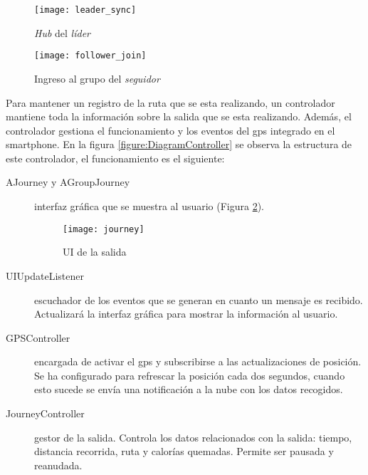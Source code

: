 \begin{figure}[H]
	\begin{minipage}{.5\textwidth}
		\begin{center}
			\texttt{[image: leader\_sync]}
			\caption{\emph{Hub} del \emph{líder}}
			\label{figure:Hub}
		\end{center}
	\end{minipage}
\begin{minipage}{.5\textwidth}
	\begin{center}
		\texttt{[image: follower\_join]}
		\caption{Ingreso al grupo del \emph{seguidor}}
		\label{figure:FollowerJoin}
	\end{center}
\end{minipage}
\end{figure}

Para mantener un registro de la ruta que se esta realizando, un controlador
mantiene toda la información sobre la salida que se esta realizando. Además,
el controlador gestiona el funcionamiento y los eventos del \gls{gps} integrado
en el smartphone. En la figura \ref{figure:DiagramController} se observa la
estructura de este controlador, el funcionamiento es el siguiente:
\begin{description}
	\item[AJourney y AGroupJourney] interfaz gráfica que se muestra al usuario
	(Figura \ref{figure:Journey}).

	\begin{figure}[H]
		\begin{center}
			\texttt{[image: journey]}
			\caption{UI de la salida}
			\label{figure:Journey}
		\end{center}
	\end{figure}

	\item[UIUpdateListener] escuchador de los eventos que se generan en cuanto
	un mensaje es recibido. Actualizará la interfaz gráfica para mostrar la
	información al usuario.

	\item[GPSController] encargada de activar el \gls{gps} y subscribirse a las
	actualizaciones de posición. Se ha configurado para refrescar la posición
	cada dos segundos, cuando esto sucede se envía una notificación a la nube con
	los datos recogidos.

	\item[JourneyController] gestor de la salida. Controla los datos relacionados
	con la salida: tiempo, distancia recorrida, ruta y calorías quemadas. Permite
	ser pausada y reanudada.
\end{description}


